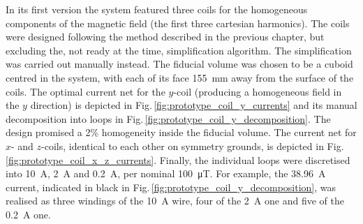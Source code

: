 In its first version the system featured three coils for the homogeneous components of the magnetic field (the first three cartesian harmonics). The coils were designed following the method described in the previous chapter, but excluding the, not ready at the time, simplification algorithm. The simplification was carried out manually instead. The fiducial volume was chosen to be a cuboid centred in the system, with each of its face \SI{155}{\milli\meter} away from the surface of the coils. The optimal current net for the $y$-coil (producing a homogeneous field in the $y$ direction) is depicted in Fig.\,\ref{fig:prototype_coil_y_currents} and its manual decomposition into loops in Fig.\,\ref{fig:prototype_coil_y_decomposition}. The design promised a 2\% homogeneity inside the fiducial volume. The current net for $x$- and $z$-coils, identical to each other on symmetry grounds, is depicted in Fig.\,\ref{fig:prototype_coil_x_z_currents}.
Finally, the individual loops were discretised into \SI{10}{\ampere}, \SI{2}{\ampere} and \SI{0.2}{\ampere}, per nominal \SI{100}{\micro\tesla}. For example, the \SI{38.96}{\ampere} current, indicated in black in Fig.\,\ref{fig:prototype_coil_y_decomposition}, was realised as three windings of the \SI{10}{\ampere} wire, four of the \SI{2}{\ampere} one and five of the \SI{0.2}{\ampere} one.

